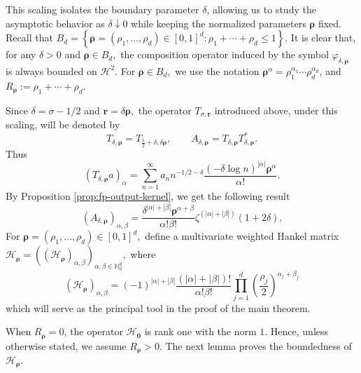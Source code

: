 \documentclass[12pt, reqno]{amsart}
\numberwithin{equation}{section}
\begin{document}
This scaling isolates the boundary parameter $\delta$, allowing us to study the asymptotic behavior as $\delta\downarrow0$ while keeping the normalized parameters $\boldsymbol{\rho}$ fixed.
Recall that $B_d=\left\{\boldsymbol{\rho}=(\rho_1, \ldots, \rho_d)\in[0,1]^d : \rho_1+\cdots+\rho_d\leq1 \right\}.$ It is clear that, for any $\delta>0$ and $\boldsymbol{\rho}\in B_d,$ the composition operator induced by the symbol $\varphi_{\delta,\boldsymbol{\rho}}$ is always
bounded on $\mathcal{H}^2$.
For $\boldsymbol{\rho}\in B_d,$
we use the notation
$\boldsymbol{\rho}^{\alpha}
= \rho_1^{\alpha_1}\cdots \rho_d^{\alpha_d}$, and $R_{\boldsymbol{\rho}}:=\rho_1+\cdots+\rho_d.$

Since $\delta=\sigma-1/2$ and $\boldsymbol{r}=\delta \boldsymbol{\rho},$ the operator $T_{\sigma,\boldsymbol{r}}$ introduced above, under this scaling, will
be denoted by
\[
T_{\delta,\boldsymbol{\rho}}
=
T_{\frac{1}{2}+\delta,\delta\boldsymbol{\rho}},
\qquad
A_{\delta,\boldsymbol{\rho}}
=
T_{\delta,\boldsymbol{\rho}}T_{\delta,\boldsymbol{\rho}}^{*}.
\]
Thus
\[
(T_{\delta,\boldsymbol{\rho}}a)_{\alpha}
=
\sum_{n=1}^{\infty}
a_n n^{-1/2-\delta}
\frac{(-\delta\log n)^{|\alpha|}\boldsymbol{\rho}^{\alpha}}{\alpha!}.
\]
By Proposition \ref{prop:fp-output-kernel}, we get the following result
\begin{equation}\label{eq:positive operator A}
(A_{\delta,\boldsymbol{\rho}})_{\alpha,\beta}
=
\frac{
\delta^{|\alpha|+|\beta|}
\boldsymbol{\rho}^{\alpha+\beta}}
{\alpha!\beta!}
\zeta^{(|\alpha|+|\beta|)}(1+2\delta).
\end{equation}
For $\boldsymbol{\rho}=(\rho_1,\ldots,\rho_d)\in[0, 1]^d,$ define  a multivariate weighted Hankel matrix $\mathcal{H}_{\boldsymbol{\rho}}
= \left((\mathcal{H}_{\boldsymbol{\rho}})_{\alpha,\beta}
\right)_{\alpha,\beta\in\mathbb{N}_{0}^{d}},$ where
\begin{equation}\label{eq:multivariate HO}
(\mathcal{H}_{\boldsymbol{\rho}})_{\alpha,\beta}
=
(-1)^{|\alpha|+|\beta|}
\frac{(|\alpha|+|\beta|)!}{\alpha!\beta!}
\prod_{j=1}^{d}
\left(\frac{\rho_j}{2}\right)^{\alpha_j+\beta_j}
\end{equation}
which will serve as the principal tool in the proof of the main theorem.

When $R_{\boldsymbol{\rho}}=0$, the operator
$\mathcal H_{\boldsymbol0}$ is rank one with the norm $1$. Hence, unless otherwise stated, we assume $R_{\boldsymbol{\rho}}>0.$
The next lemma proves the boundedness of
$\mathcal H_{\boldsymbol{\rho}}$.
\end{document}
